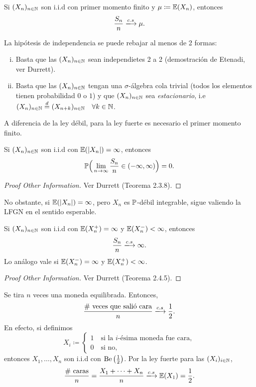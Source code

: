 \begin{theorem}
	Si $(X_{n})_{n \in \mathbb{N}}$ son i.i.d con primer momento finito y $\mu \coloneq \mathbb{E}(X_{n})$, entonces
	\[ \frac{S_{n}}{n} \xlongrightarrow{c.s} \mu. \]
\end{theorem}

\begin{remark}
	La hipótesis de independencia se puede rebajar al menos de 2 formas:
	\begin{enumerate}[i)]
		\item Basta que las $(X_{n})_{n \in \mathbb{N}}$ sean independietes 2 a 2 (demostración de Etenadi, ver Durrett).

		\item Basta que las $(X_{n})_{n \in \mathbb{N}}$ tengan una $\sigma$-álgebra cola trivial (todos los elementos tienen probabilidad $0$ o $1$) y que $(X_{n})_{n \in \mathbb{N}}$ sea \textit{estacionario}, i.e $(X_{n})_{n \in \mathbb{N}} \stackrel{d}{=} (X_{n + k})_{n \in \mathbb{N}} \quad \forall k \in \mathbb{N}$.
	\end{enumerate}
	A diferencia de la ley débil, para la ley fuerte es necesario el primer momento finito.
\end{remark}

\begin{theorem}
	Si $(X_{n})_{n \in \mathbb{N}}$ son i.i.d con $\mathbb{E}(|X_{n}|) = \infty$, entonces
	\[ \mathbb{P} \Big( \lim_{n \to \infty} \frac{S_{n}}{n} \in (-\infty,\infty) \Big) = 0. \]
\end{theorem}
\begin{proof}[Proof Other Information]
	Ver Durrett (Teorema 2.3.8).
\end{proof}

\begin{note}
	No obstante, si $\mathbb{E}(|X_{n}|) = \infty$, pero $X_{n}$ es $\mathbb{P}$-débil integrable, sigue valiendo la LFGN en el sentido esperable.
\end{note}

\begin{theorem}
	Si $(X_{n})_{n \in \mathbb{N}}$ son i.i.d con $\mathbb{E}(X_{n}^{+}) = \infty$ y $\mathbb{E}(X_{n}^{-}) < \infty$, entonces
	\[ \frac{S_{n}}{n} \xlongrightarrow{c.s} \infty. \]
	Lo análogo vale si $\mathbb{E}(X_{n}^{-}) = \infty$ y $\mathbb{E}(X_{n}^{+}) < \infty$.
\end{theorem}
\begin{proof}[Proof Other Information]
	Ver Durrett (Teorema 2.4.5).
\end{proof}

\begin{eg}
	Se tira $n$ veces una moneda equilibrada. Entonces,
	\[ \frac{\# \text{ veces que salió cara}}{n} \xlongrightarrow{c.s} \frac{1}{2}. \]
	En efecto, si definimos
	\[ X_{i} \coloneq \begin{cases}
		1 \quad \text{si la $i$-ésima moneda fue cara}, \\
		0 \quad \text{si no},
	\end{cases} \]
	entonces $X_{1},\dots,X_{n}$ son i.i.d con $\operatorname{Be} \big( \frac{1}{2} \big)$. Por la ley fuerte para las $(X_{i})_{i \in \mathbb{N}}$,
	\[ \frac{\# \text{ caras}}{n} = \frac{X_{1} + \cdots + X_{n}}{n} \xlongrightarrow{c.s} \mbb{E}(X_{1}) = \frac{1}{2}. \]
\end{eg}
